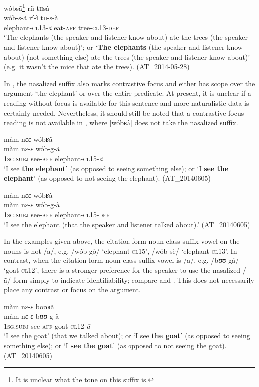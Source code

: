 \documentclass[output=paper]{langsci/langscibook}
\begin{document}
wóbsã\footnote{It is unclear what the tone on this suffix is.} ríì tɪɪsà\\
\gll wób-s-ã rí-ì tɪɪ-s-à\\
elephant-\textsc{cl13-}\textit{ã} eat-\textsc{aff} tree-\textsc{cl13-def}\\
\glt ‘The elephants (the speaker and listener know about) ate the trees (the speaker and listener know about)’; or ‘\textbf{The elephants} (the speaker and listener know about) (not something else) ate the trees (the speaker and listener know about)’ (e.g. it wasn’t the mice that ate the trees). (AT\_2014-05-28)
\z

In , the nasalized suffix also marks contrastive focus and either has scope over the argument ‘the elephant’ or over the entire predicate. At present, it is unclear if a reading without focus is available for this sentence and more naturalistic data is certainly needed. Nevertheless, it should still be noted that a contrastive focus reading is not available in , where [wóbʁà] does not take the nasalized suffix.


\ea\label{ex:teo:46}
màm nɛɛ wóbʁã\\
\gll màm nɛ-ɛ wób-g-ã\\
\textsc{1sg.subj} see-\textsc{aff} elephant-\textsc{cl15}-\textit{ã}\\
\glt ‘I see \textbf{the elephant}’ (as opposed to seeing something else); or ‘I \textbf{see the elephant}’ (as opposed to not seeing the elephant). (AT\_20140605)
\z

\ea\label{ex:teo:47}
màm  nɛɛ wóbʁà\\
\gll màm nɛ-ɛ wób-g-à\\
1\textsc{sg.subj} see-\textsc{aff} elephant-\textsc{cl15-def}\\
\glt ‘I see the elephant (that the speaker and listener talked about).’ (AT\_20140605)
\z

In the examples given above, the citation form noun class suffix vowel on the nouns is not /a/, e.g. /wób-gò/ ‘elephant-\textsc{cl15}’, /wób-sè/ ‘elephant-\textsc{cl13}’. In contrast, when the citation form noun class suffix vowel is /a/, e.g. /bʊʊ-gá/ ‘goat-\textsc{cl12}’, there is a stronger preference for the speaker to use the nasalized /-ã/ form simply to indicate identifiability; compare  and . This does not necessarily place any contrast or focus on the argument.


\ea\label{ex:teo:48}
màm  nɛ-ɛ bʊʊʁã\\
\gll màm nɛ-ɛ bʊʊ-g-ã\\
\textsc{1sg.subj} see-\textsc{aff} goat-\textsc{cl12}-\textit{ã}\\
\glt ‘I see the goat’ (that we talked about); or ‘I see \textbf{the goat}’ (as opposed to seeing something else); or ‘I \textbf{see the goat}’ (as opposed to not seeing the goat). (AT\_20140605)
\z
\end{document}
